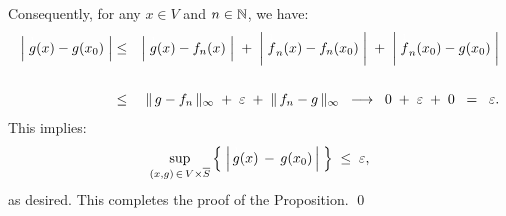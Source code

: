 Consequently, for any $x \in V$ and $n \in \mathbb{N}$, we have:
\begin{eqnarray*}
\left\vert\; \overset{{\color{white}1}}{g}(x) - g(x_{0})\;\right\vert
&\leq& \left\vert\; \overset{{\color{white}1}}{g}(x) - f_{n}(x)\;\right\vert
		\;+\; \left\vert\; \overset{{\color{white}1}}{f}_{n}(x) - f_{n}(x_{0})\;\right\vert
		\;+\; \left\vert\; \overset{{\color{white}1}}{f}_{n}(x_{0}) - g(x_{0})\;\right\vert
\\ \\
&\leq& \Vert\,g - f_{n}\,\Vert_{\infty} \;+\; \varepsilon \;+\; \Vert\,f_{n} - g\,\Vert_{\infty}
\;\; \longrightarrow \;\; 0 \;+\; \varepsilon \;+\; 0 \;\;=\;\; \varepsilon.  
\end{eqnarray*}
This implies:
\begin{equation*}
\sup_{(x,g) \,\in\, V \times \overline{S}}\left\{\;\left\vert\,\overset{{\color{white}1}}{g}(x)\,-\,g(x_{0})\,\right\vert\;\right\}
\;\leq\; \varepsilon,
\end{equation*}
as desired. This completes the proof of the Proposition.
\qed

